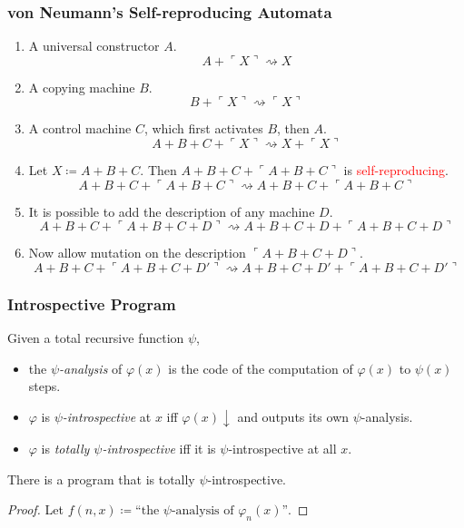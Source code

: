 \documentclass[UTF8,11pt,colorlinks,compress,openany]{beamer}%
\begin{document}
\begin{frame}\frametitle{von Neumann's Self-reproducing Automata}
	\begin{enumerate}
		\item A universal constructor $A$.
		\[A+\ulcorner X\urcorner\rightsquigarrow X\]
		\item A copying machine $B$.
		\[B+\ulcorner X\urcorner\rightsquigarrow\ulcorner X\urcorner\]
		\item A control machine $C$, which first activates $B$, then $A$.
		\[A+B+C+\ulcorner X\urcorner\rightsquigarrow X+\ulcorner X\urcorner\]
		\item Let $X\coloneqq A+B+C$. {Then} $A+B+C+\ulcorner A+B+C\urcorner$ is \textcolor{red}{self-reproducing}.
		\[A+B+C+\ulcorner A+B+C\urcorner\rightsquigarrow A+B+C+\ulcorner A+B+C\urcorner\]
		\item It is possible to add the description of any machine $D$.
		\[A+B+C+\ulcorner A+B+C+D\urcorner\rightsquigarrow A+B+C+D+\ulcorner A+B+C+D\urcorner\]
		\item Now allow mutation on the description $\ulcorner A+B+C+D\urcorner$.
		\[A+B+C+\ulcorner A+B+C+D'\urcorner\rightsquigarrow A+B+C+D'+\ulcorner A+B+C+D'\urcorner\]
	\end{enumerate}
\end{frame}

\begin{frame}\frametitle{Introspective Program}
	\begin{definition}
		Given a total recursive function $\psi$,
		\begin{itemize}
			\item the \emph{$\psi$-analysis} of $\varphi(x)$ is the code of the computation of $\varphi(x)$ to $\psi(x)$ steps.
			\item $\varphi$ is \emph{$\psi$-introspective} at $x$ iff $\varphi(x)\downarrow$ and outputs its own $\psi$-analysis.
			\item $\varphi$ is \emph{totally $\psi$-introspective} iff it is $\psi$-introspective at all $x$. 
		\end{itemize}
	\end{definition}
	\begin{corollary}
		There is a program that is totally $\psi$-introspective.
	\end{corollary}
	\begin{proof}
		Let $f(n,x)\coloneqq \mbox{``the $\psi$-analysis of $\varphi_n(x)$''}$.
	\end{proof}
\end{frame}
\end{document}
